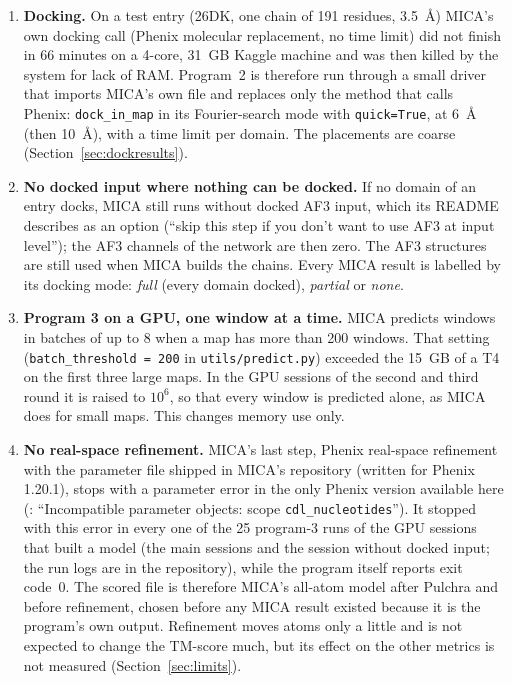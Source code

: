 \begin{enumerate}
\item \textbf{Docking.} On a test entry (26DK, one chain of 191 residues, 3.5~\AA{}) MICA's own docking call (Phenix molecular replacement, no time limit) did not finish in 66 minutes on a 4-core, 31~GB Kaggle machine and was then killed by the system for lack of RAM. Program~2 is therefore run through a small driver that imports MICA's own file and replaces only the method that calls Phenix: \texttt{dock\_in\_map} in its Fourier-search mode with \texttt{quick=True}, at 6~\AA{} (then 10~\AA{}), with a time limit per domain. The placements are coarse (Section~\ref{sec:dockresults}).
\item \textbf{No docked input where nothing can be docked.} If no domain of an entry docks, MICA still runs without docked AF3 input, which its README describes as an option (``skip this step if you don't want to use AF3 at input level''); the AF3 channels of the network are then zero. The AF3 structures are still used when MICA builds the chains. Every MICA result is labelled by its docking mode: \emph{full} (every domain docked), \emph{partial} or \emph{none}.
\item \textbf{Program 3 on a GPU, one window at a time.} MICA predicts windows in batches of up to 8 when a map has more than 200 windows. That setting (\texttt{batch\_threshold = 200} in \texttt{utils/predict.py}) exceeded the 15~GB of a T4 on the first three large maps. In the GPU sessions of the second and third round it is raised to $10^6$, so that every window is predicted alone, as MICA does for small maps. This changes memory use only.
\item \textbf{No real-space refinement.} MICA's last step, Phenix real-space refinement with the parameter file shipped in MICA's repository (written for Phenix 1.20.1), stops with a parameter error in the only Phenix version available here (\PhenixVersion: ``Incompatible parameter objects: scope \texttt{cdl\_nucleotides}''). It stopped with this error in every one of the 25 program-3 runs of the GPU sessions that built a model (the main sessions and the session without docked input; the run logs are in the repository), while the program itself reports exit code~0. The scored file is therefore MICA's all-atom model after Pulchra and before refinement, chosen before any MICA result existed because it is the program's own output. Refinement moves atoms only a little and is not expected to change the TM-score much, but its effect on the other metrics is not measured (Section~\ref{sec:limits}).
\end{enumerate}


